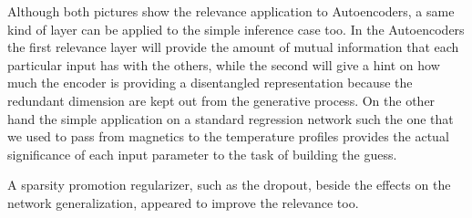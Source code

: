 Although both pictures show the relevance application to Autoencoders, a same kind of layer can be applied to the simple inference case too.
In the Autoencoders the first relevance layer will provide the amount of mutual information that each particular input has with the others, while the second will give a hint on how much the encoder is providing a disentangled representation because the redundant dimension are kept out from the generative process.
On the other hand the simple application on a standard regression network such the one that we used to pass from magnetics to the temperature profiles provides the actual significance of each input parameter to the task of building the guess.

A sparsity promotion regularizer, such as the dropout, beside the effects on the network generalization, appeared to improve the relevance too.
%

